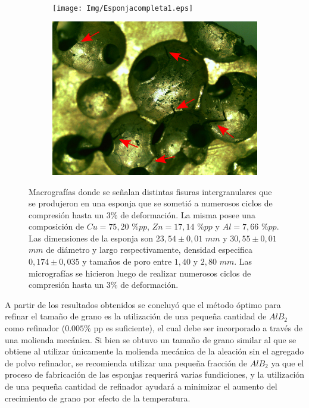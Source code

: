 \documentclass[a4paper,12pt,fleqn,twoside,openany]{book}
\begin{document}
    \begin{figure}%
    \centering
    
    ~ %
     \begin{subfigure}{0.45\textwidth}
        \texttt{[image: Img/Esponjacompleta1.eps]}
        \caption{}
        \label{fig:EsponjaCompleta1}
    \end{subfigure}
 \begin{subfigure}{0.5\textwidth}
        \includegraphics[width=\textwidth]{Img/Fisuras.eps}
        \caption{}
        \label{fig:Ciclos}
    \end{subfigure}
    \caption{Macrografías donde se señalan distintas fisuras intergranulares que se produjeron en una esponja que se sometió a numerosos ciclos de compresión hasta un $3\%$ de deformación. La misma posee una composición de $Cu=75,20$ $\%pp$, $Zn=17,14$ $\%pp$ y $Al=7,66$ $\%pp$. Las dimensiones de la esponja son $23,54 \pm0,01$ $mm$ y $30,55 \pm0,01$ $mm$ de diámetro y largo respectivamente, densidad especifica $0,174 \pm 0,035$ y tamaños de poro entre $1,40 $ y $2,80$ $mm$. Las micrografías se hicieron luego de realizar numerosos ciclos de compresión hasta un $3\%$ de deformación.}
    \label{fig:Fisuras}
    \end{figure}
 

A partir de los resultados obtenidos se concluyó que el método óptimo para refinar el tamaño de grano es la utilización de una pequeña cantidad de $AlB_2$ como refinador ($0.005 \%$ pp es suficiente), el cual debe ser incorporado a través de una molienda mecánica. Si bien se obtuvo un tamaño de grano similar al que se obtiene al utilizar únicamente la molienda mecánica de la aleación sin el agregado de polvo refinador, se recomienda utilizar una pequeña fracción de $AlB_2$ ya que el proceso de fabricación de las esponjas requerirá varias fundiciones, y la utilización de una pequeña cantidad de refinador ayudará a minimizar el aumento del crecimiento de grano por efecto de la temperatura.
\end{document}
